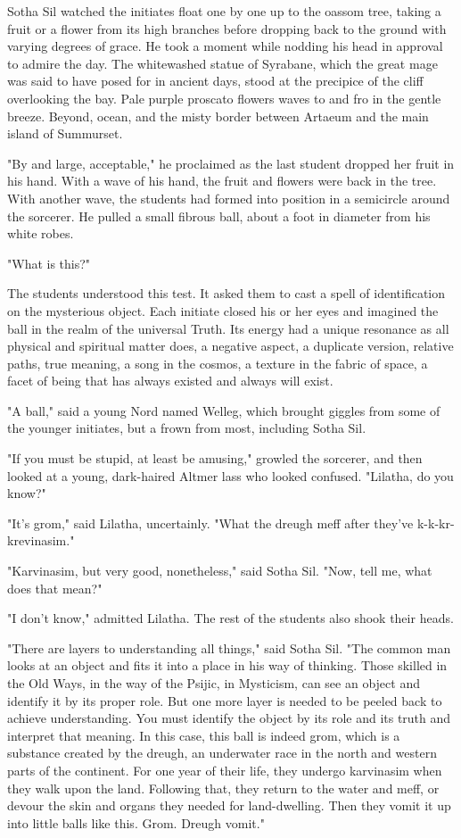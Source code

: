 \clearpage
{}

\dropcap Sotha Sil watched the initiates float one by one up to the oassom tree, taking a fruit or a flower from its high branches before dropping back to the ground with varying degrees of grace. He took a moment while nodding his head in approval to admire the day. The whitewashed statue of Syrabane, which the great mage was said to have posed for in ancient days, stood at the precipice of the cliff overlooking the bay. Pale purple proscato flowers waves to and fro in the gentle breeze. Beyond, ocean, and the misty border between Artaeum and the main island of Summurset.

"By and large, acceptable," he proclaimed as the last student dropped her fruit in his hand. With a wave of his hand, the fruit and flowers were back in the tree. With another wave, the students had formed into position in a semicircle around the sorcerer. He pulled a small fibrous ball, about a foot in diameter from his white robes.

"What is this?"

The students understood this test. It asked them to cast a spell of identification on the mysterious object. Each initiate closed his or her eyes and imagined the ball in the realm of the universal Truth. Its energy had a unique resonance as all physical and spiritual matter does, a negative aspect, a duplicate version, relative paths, true meaning, a song in the cosmos, a texture in the fabric of space, a facet of being that has always existed and always will exist.

"A ball," said a young Nord named Welleg, which brought giggles from some of the younger initiates, but a frown from most, including Sotha Sil.

"If you must be stupid, at least be amusing," growled the sorcerer, and then looked at a young, dark-haired Altmer lass who looked confused. "Lilatha, do you know?"

"It's grom," said Lilatha, uncertainly. "What the dreugh meff after they've k-k-kr-krevinasim."

"Karvinasim, but very good, nonetheless," said Sotha Sil. "Now, tell me, what does that mean?"

"I don't know," admitted Lilatha. The rest of the students also shook their heads.

"There are layers to understanding all things," said Sotha Sil. "The common man looks at an object and fits it into a place in his way of thinking. Those skilled in the Old Ways, in the way of the Psijic, in Mysticism, can see an object and identify it by its proper role. But one more layer is needed to be peeled back to achieve understanding. You must identify the object by its role and its truth and interpret that meaning. In this case, this ball is indeed grom, which is a substance created by the dreugh, an underwater race in the north and western parts of the continent. For one year of their life, they undergo karvinasim when they walk upon the land. Following that, they return to the water and meff, or devour the skin and organs they needed for land-dwelling. Then they vomit it up into little balls like this. Grom. Dreugh vomit."

